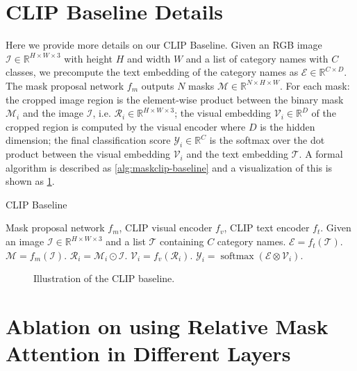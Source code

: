 \documentclass{article}
\theoremstyle{plain}
\theoremstyle{definition}
\theoremstyle{remark}
\begin{document}
\section{CLIP Baseline Details}

Here we provide more details on our CLIP Baseline. Given an RGB image $\mathcal I \in \mathbb{R}^{H\times W \times 3}$ with height $H$ and width $W$ and a list of category names with $C$ classes, we precompute the text embedding of the category names as $\mathcal E \in \mathbb{R}^{C\times D}$. The mask proposal network $f_m$ outputs $N$ masks $\mathcal M \in \mathbb{R}^{N \times H \times W}$. For each mask: the cropped image region is the element-wise product between the binary mask $\mathcal M_i$ and the image $\mathcal I$, i.e. $\mathcal R_i \in \mathbb{R}^{H\times W\times 3}$; the visual embedding $\mathcal V_i \in \mathbb{R}^D$ of the cropped region is computed by the visual encoder where $D$ is the hidden dimension; the final classification score $\mathcal Y_i \in \mathbb{R}^C$ is the softmax over the dot product between the visual embedding $\mathcal V_i$ and the text embedding $\mathcal T$. 
A formal algorithm is described as \ref{alg:maskclip-baseline} and a visualization of this is shown as \ref{fig:illus-baseline}.

\begin{algorithm}[h]
	\caption{CLIP Baseline}
	\begin{algorithmic}
	    \Require Mask proposal network $f_m$, CLIP visual encoder $f_v$, CLIP text encoder $f_t$.
		\State Given an image $\mathcal{I} \in \mathbb{R}^{H\times W \times 3}$ and a list $\mathcal T$ containing $C$ category names.
		\State $\mathcal E = f_t(\mathcal T)$.
		\State $\mathcal M = f_m(\mathcal I)$.
		\State $\mathcal R_i = \mathcal M_i \odot \mathcal I$.
		\State $\mathcal V_i = f_v(\mathcal R_i)$.
		\State $\mathcal Y_i = \operatorname{softmax}(\mathcal E \otimes \mathcal V_i)$.
		\EndFor
	\end{algorithmic}
	\label{alg:maskclip-baseline}
\end{algorithm}

\begin{figure}[H]
\centering
{}
\caption{Illustration of the CLIP baseline.}
\label{fig:illus-baseline}
\end{figure}

\section{Ablation on using Relative Mask Attention in Different Layers} 
\end{document}
